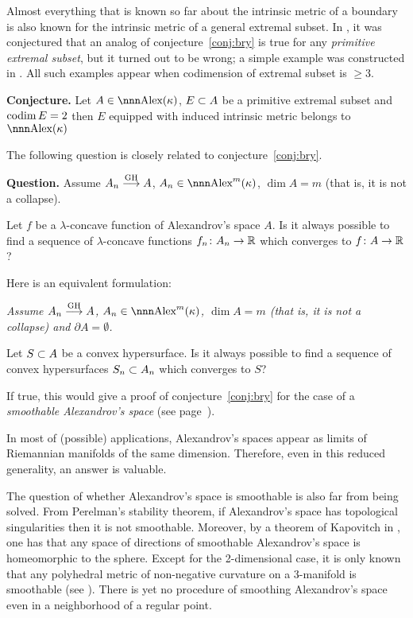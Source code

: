 \documentclass{article}
\begin{document}
Almost everything that is known so far about the intrinsic metric of a boundary is also known for the intrinsic metric of a general extremal subset.
In \cite{perelman-petrunin:extremal}, it was conjectured  that an analog of conjecture~\ref{conj:bry} is true for any \emph{primitive extremal subset}, but it turned out to be wrong; a simple example was constructed in \cite{petrunin:extremal}. 
All such examples appear when codimension of extremal subset is $\ge 3$.

\begin{thm}{\bf Conjecture.}\label{conj:codim=2}
Let $A\in\Alex(\kappa)$, $E\subset A$ be a primitive extremal subset and $\operatorname{codim}
E=2$ then $E$ equipped with induced intrinsic metric belongs to  $\Alex(\kappa)$
\end{thm}

The following question is closely related to conjecture~\ref{conj:bry}.

\begin{thm}{\bf Question.}\label{qst:lift-conc}
Assume $A_n\GHto A$, $A_n\in \Alex^m(\kappa)$, $\dim A=m$ (that is, 
it is not a collapse).

Let $f$ be a $\lambda$-concave function of Alexandrov's space $A$. 
Is it always possible to find a sequence of $\lambda$-concave functions
$f_n\colon A_n\to \mathbb{R}$ which converges to $f\colon A\to\mathbb{R}$? 
\end{thm}

Here is an equivalent formulation:

\bigskip

 {\it Assume $A_n\GHto A$, $A_n\in \Alex^m(\kappa)$, $\dim
A=m$ (that is, it is not a collapse) and $\partial A=\emptyset$.

Let $S\subset A$ be a convex hypersurface. 
Is it always possible to find a sequence of convex hypersurfaces $S_n\subset A_n$
which converges to $S$?
}

\bigskip

If true, this would give a proof of  conjecture~\ref{conj:bry} for the
case of a \emph{smoothable Alexandrov's space} (see page~\pageref{smoothable}).

In most of (possible) applications, Alexandrov's spaces appear as
limits of Riemannian manifolds of the same dimension.
Therefore, even in this reduced generality, 
an answer is valuable.

The question of whether Alexandrov's space is smoothable is also far from being solved.
From Perelman's stability theorem, if Alexandrov's space has topological singularities then it is not smoothable.
Moreover, by a theorem of Kapovitch in \cite{kapovitch:regularity},
one has that any space of
directions of smoothable Alexandrov's space is homeomorphic to the sphere. 
Except for the 2-dimensional case, it is only known that any polyhedral metric of non-negative curvature on a 3-manifold is smoothable (see \cite{matveev:smooth}).
There is yet no procedure of smoothing Alexandrov's space even in a neighborhood of a regular point.
\end{document}
